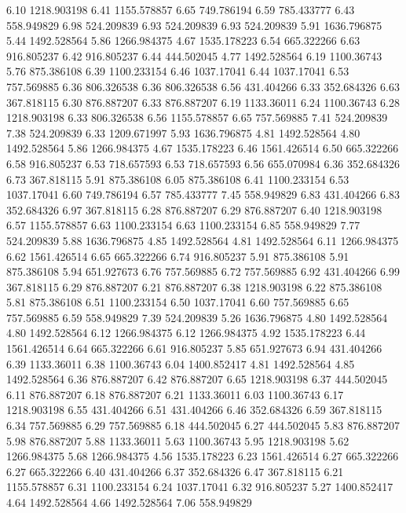 6.10 	1218.903198
6.41 	1155.578857
6.65 	749.786194
6.59 	785.433777
6.43 	558.949829
6.98 	524.209839
6.93 	524.209839
6.93 	524.209839
5.91 	1636.796875
5.44 	1492.528564
5.86 	1266.984375
4.67 	1535.178223
6.54 	665.322266
6.63 	916.805237
6.42 	916.805237
6.44 	444.502045
4.77 	1492.528564
6.19 	1100.36743
5.76 	875.386108
6.39 	1100.233154
6.46 	1037.17041
6.44 	1037.17041
6.53 	757.569885
6.36 	806.326538
6.36 	806.326538
6.56 	431.404266
6.33 	352.684326
6.63 	367.818115
6.30 	876.887207
6.33 	876.887207
6.19 	1133.36011
6.24 	1100.36743
6.28 	1218.903198
6.33 	806.326538
6.56 	1155.578857
6.65 	757.569885
7.41 	524.209839
7.38 	524.209839
6.33 	1209.671997
5.93 	1636.796875
4.81 	1492.528564
4.80 	1492.528564
5.86 	1266.984375
4.67 	1535.178223
6.46 	1561.426514
6.50 	665.322266
6.58 	916.805237
6.53 	718.657593
6.53 	718.657593
6.56 	655.070984
6.36 	352.684326
6.73 	367.818115
5.91 	875.386108
6.05 	875.386108
6.41 	1100.233154
6.53 	1037.17041
6.60 	749.786194
6.57 	785.433777
7.45 	558.949829
6.83 	431.404266
6.83 	352.684326
6.97 	367.818115
6.28 	876.887207
6.29 	876.887207
6.40 	1218.903198
6.57 	1155.578857
6.63 	1100.233154
6.63 	1100.233154
6.85 	558.949829
7.77 	524.209839
5.88 	1636.796875
4.85 	1492.528564
4.81 	1492.528564
6.11 	1266.984375
6.62 	1561.426514
6.65 	665.322266
6.74 	916.805237
5.91 	875.386108
5.91 	875.386108
5.94 	651.927673
6.76 	757.569885
6.72 	757.569885
6.92 	431.404266
6.99 	367.818115
6.29 	876.887207
6.21 	876.887207
6.38 	1218.903198
6.22 	875.386108
5.81 	875.386108
6.51 	1100.233154
6.50 	1037.17041
6.60 	757.569885
6.65 	757.569885
6.59 	558.949829
7.39 	524.209839
5.26 	1636.796875
4.80 	1492.528564
4.80 	1492.528564
6.12 	1266.984375
6.12 	1266.984375
4.92 	1535.178223
6.44 	1561.426514
6.64 	665.322266
6.61 	916.805237
5.85 	651.927673
6.94 	431.404266
6.39 	1133.36011
6.38 	1100.36743
6.04 	1400.852417
4.81 	1492.528564
4.85 	1492.528564
6.36 	876.887207
6.42 	876.887207
6.65 	1218.903198
6.37 	444.502045
6.11 	876.887207
6.18 	876.887207
6.21 	1133.36011
6.03 	1100.36743
6.17 	1218.903198
6.55 	431.404266
6.51 	431.404266
6.46 	352.684326
6.59 	367.818115
6.34 	757.569885
6.29 	757.569885
6.18 	444.502045
6.27 	444.502045
5.83 	876.887207
5.98 	876.887207
5.88 	1133.36011
5.63 	1100.36743
5.95 	1218.903198
5.62 	1266.984375
5.68 	1266.984375
4.56 	1535.178223
6.23 	1561.426514
6.27 	665.322266
6.27 	665.322266
6.40 	431.404266
6.37 	352.684326
6.47 	367.818115
6.21 	1155.578857
6.31 	1100.233154
6.24 	1037.17041
6.32 	916.805237
5.27 	1400.852417
4.64 	1492.528564
4.66 	1492.528564
7.06 	558.949829
